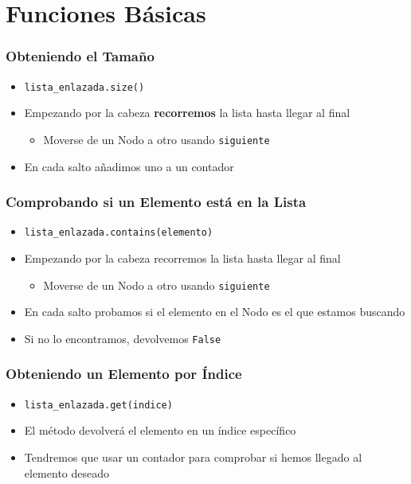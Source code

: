 \documentclass[11pt]{beamer}
\begin{document}
\section{Funciones Básicas}

	\begin{frame}[fragile]
		\frametitle{Obteniendo el Tamaño}
		\begin{itemize}
			\item \lstinline|lista_enlazada.size()|
			\item Empezando por la cabeza \textbf{recorremos} la lista hasta llegar al final
			\begin{itemize}
				\item Moverse de un Nodo a otro usando \texttt{siguiente}
			\end{itemize}
			\item En cada salto añadimos uno a un contador
		\end{itemize}
	\end{frame}

	\begin{frame}[fragile]
		\frametitle{Comprobando si un Elemento está en la Lista}
		\begin{itemize}
			\item \lstinline|lista_enlazada.contains(elemento)|
			\item Empezando por la cabeza recorremos la lista hasta llegar al final
			\begin{itemize}
				\item Moverse de un Nodo a otro usando \texttt{siguiente}
			\end{itemize}
			\item En cada salto probamos si el elemento en el Nodo es el que estamos buscando
			\item Si no lo encontramos, devolvemos \lstinline|False|
		\end{itemize}
	\end{frame}

	\begin{frame}[fragile]
		\frametitle{Obteniendo un Elemento por Índice}
		\begin{itemize}
			\item \lstinline|lista_enlazada.get(indice)|
			\item El método devolverá el elemento en un índice específico
			\item Tendremos que usar un contador para comprobar si hemos llegado al elemento deseado
		\end{itemize}
	\end{frame}
\end{document}

